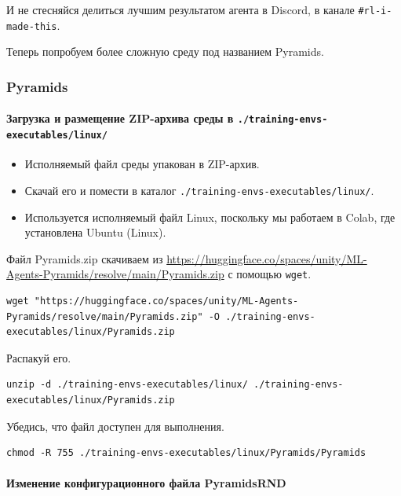 \documentclass[11pt,a4paper]{article}
\begin{document}
И не стесняйся делиться лучшим результатом агента в Discord, в канале \texttt{\#rl-i-made-this}.

Теперь попробуем более сложную среду под названием Pyramids.

\subsubsection{Pyramids}\label{pyramids}

\paragraph{Загрузка и размещение ZIP-архива среды в \texttt{./training-envs-executables/linux/}}\label{download-and-move-the-environment-zip-file-in-.training-envs-executableslinux-1}

\begin{itemize}
\tightlist
\item
  Исполняемый файл среды упакован в ZIP-архив.
\item
  Скачай его и помести в каталог \texttt{./training-envs-executables/linux/}.
\item
  Используется исполняемый файл Linux, поскольку мы работаем в Colab, где установлена Ubuntu (Linux).
\end{itemize}

Файл Pyramids.zip скачиваем из \url{https://huggingface.co/spaces/unity/ML-Agents-Pyramids/resolve/main/Pyramids.zip} с помощью \texttt{wget}.

\begin{lstlisting}
wget "https://huggingface.co/spaces/unity/ML-Agents-Pyramids/resolve/main/Pyramids.zip" -O ./training-envs-executables/linux/Pyramids.zip
\end{lstlisting}

Распакуй его.

\begin{lstlisting}
unzip -d ./training-envs-executables/linux/ ./training-envs-executables/linux/Pyramids.zip
\end{lstlisting}

Убедись, что файл доступен для выполнения.

\begin{lstlisting}
chmod -R 755 ./training-envs-executables/linux/Pyramids/Pyramids
\end{lstlisting}

\paragraph{Изменение конфигурационного файла PyramidsRND}\label{modify-the-pyramidsrnd-config-file}
\end{document}
